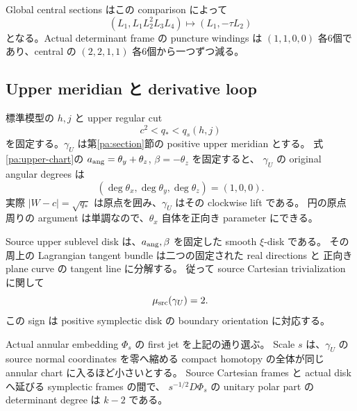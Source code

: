 Global central sections はこの comparison によって
\[
 (L_1,L_1L_2^2L_3L_4)\longmapsto(L_1,-\tau L_2)
\]
となる。Actual determinant frame の puncture windings は
$(1,1,0,0)$ 各6個であり、central の $(2,2,1,1)$ 各6個から一つずつ減る。

\subsection{Upper meridian と derivative loop}

標準模型の $h,j$ と upper regular cut
\[
 c^2<q_*<q_s(h,j)
\]
を固定する。$\gamma_U$ は第\ref{pa:section}節の positive upper meridian とする。
式\eqref{pa:upper-chart}の $a_{\rm ang}=\theta_y+\theta_z$, $\beta=-\theta_z$ を固定すると、
$\gamma_U$ の original angular degrees は
\begin{equation}\label{mx:source-angular}
 (\deg\theta_x,\deg\theta_y,\deg\theta_z)=(1,0,0).
\end{equation}
実際 $|W-c|=\sqrt{q_*}$ は原点を囲み、$\gamma_U$ はその clockwise lift である。
円の原点周りの argument は単調なので、$\theta_x$ 自体を正向き parameter にできる。

Source upper sublevel disk は、$a_{\rm ang},\beta$ を固定した smooth $\xi$-disk である。
その周上の Lagrangian tangent bundle は二つの固定された real directions と
正向き plane curve の tangent line に分解する。
従って source Cartesian trivialization に関して
\begin{equation}\label{mx:source-maslov}
 \mu_{\rm src}(\gamma_U)=2.
\end{equation}
この sign は positive symplectic disk の boundary orientation に対応する。

\begin{lemma}\label{mx:derivative}
Actual annular embedding $\Phi_s$ の first jet を上記の通り選ぶ。
Scale $s$ は、$\gamma_U$ の source normal coordinates を零へ縮める compact homotopy
の全体が同じ annular chart に入るほど小さいとする。
Source Cartesian frames と actual disk へ延びる symplectic frames の間で、
$s^{-1/2}D\Phi_s$ の unitary polar part の determinant degree は $k-2$ である。
\end{lemma}

